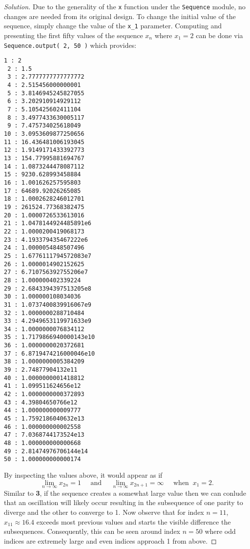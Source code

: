 \documentclass[ 12pt ]{article}
\begin{document}
\begin{enumerate}
		\begin{proof}[Solution]\renewcommand{\qedsymbol}{}
			Due to the generality of the \verb|x| function under the \verb|Sequence| module, no changes are needed from its original design. To change the initial value of the sequence,
			simply change the value of the \verb|x_1| parameter. Computing and presenting the first fifty values of the sequence $x_n$ where $x_1 = 2$ can be done via
			\verb|Sequence.output( 2, 50 )| which provides:
			\begin{lstlisting}[basicstyle=\ttfamily\footnotesize, tabsize=4, frame=single]
 1 : 2
 2 : 1.5
 3 : 2.7777777777777772
 4 : 2.515456000000001
 5 : 3.8146945245827055
 6 : 3.202910914929112
 7 : 5.105425602411104
 8 : 3.4977433630005117
 9 : 7.475734025618049
10 : 3.0953609877250656
11 : 16.436481006193045
12 : 1.9149171433392773
13 : 154.77995881694767
14 : 1.0873244478087112
15 : 9230.628993458884
16 : 1.001626257595803
17 : 64689.92026265085
18 : 1.0002628246012701
19 : 261524.77368382475
20 : 1.0000726533613016
21 : 1.0478144924485891e6
22 : 1.0000200419068173
23 : 4.193379435467222e6
24 : 1.0000054848507496
25 : 1.6776111794572083e7
26 : 1.0000014902152625
27 : 6.710756392755206e7
28 : 1.000000402339224
29 : 2.6843394397513205e8
30 : 1.000000108034036
31 : 1.0737400839916067e9
32 : 1.0000000288710484
33 : 4.2949653119971633e9
34 : 1.0000000076834112
35 : 1.7179866940000143e10
36 : 1.0000000020372681
37 : 6.8719474216000046e10
38 : 1.0000000005384209
39 : 2.74877904132e11
40 : 1.0000000001418812
41 : 1.099511624656e12
42 : 1.0000000000372893
43 : 4.39804650766e12
44 : 1.000000000009777
45 : 1.7592186040632e13
46 : 1.000000000002558
47 : 7.0368744173524e13
48 : 1.000000000000668
49 : 2.81474976706144e14
50 : 1.000000000000174
			\end{lstlisting}
			By inspecting the values above, it would appear as if $$\lim_{n \to \infty} x_{2n} = 1 \;\;\;\;\; \mathrm{and} \;\;\;\;\; \lim_{n \to \infty} x_{2n+1} = \infty\;\;\;\;\;
			\mathrm{when}\;\; x_1 = 2.$$ Similar to \textbf{3}, if the sequence creates a somewhat large value then we can conlude that an oscillation will likely occur resulting
			in the subsequence of one parity to diverge and the other to converge to 1. Now observe that for index $n=11$, $x_{11} \approx 16.4$ exceeds most previous values and starts
			the visible difference the subsequences. Consequently, this can be seen around index $n=50$ where odd indices are extremely large and even indices approach 1 from above.
		\end{proof}



\end{enumerate}
\end{document}
